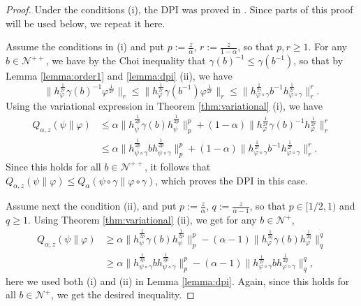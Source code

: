 \documentclass[12pt]{article}
\theoremstyle{definition}
\theoremstyle{remark}
\numberwithin{equation}{section}
\def\Ne{\mathcal N}
\begin{document}
\begin{proof} Under the conditions (i), the DPI was proved in \cite[Theorem 1
(viii)]{kato2023onrenyi}.
 Since parts of this proof will be used below, we repeat it here.

 Assume the conditions in (i) and put $p:=\frac{z}{\alpha}$, $r:=\frac{z}{1-\alpha}$, so
 that  $p,r\ge 1$. 
For any   $b\in \Ne^{++}$, we have by  the Choi inequality \cite{choi1974aschwarz} 
that  $\gamma(b)^{-1}\le \gamma(b^{-1})$, so that  by Lemma \ref{lemma:order1} and
\ref{lemma:dpi} (ii), we have 
\begin{equation}\label{eq:ineq}
\|h_\varphi^{\frac{1}{2r}}\gamma(b)^{-1}\varphi^{\frac{1}{2r}}\|_r\le
\|h_\varphi^{\frac{1}{2r}}\gamma(b^{-1})\varphi^{\frac{1}{2r}}\|_r\le\|h_{\varphi\circ\gamma}^{\frac{1}{2r}}b^{-1}h_{\varphi\circ\gamma}^{\frac{1}{2r}}\|_r^r .
\end{equation}
Using the variational expression in Theorem \ref{thm:variational} (i), we have
\begin{align}\label{eq:dpif}
Q_{\alpha,z}(\psi\|\varphi)&\le \alpha\|h_\psi^{\frac{1}{2p}}\gamma(b)h_\psi^{\frac{1}{2p}}\|_p^p+
(1-\alpha)\|h_\varphi^{\frac{1}{2r}}\gamma(b)^{-1}h_\varphi^{\frac{1}{2r}}\|_r^r\\
&\le  \alpha\|h_{\psi\circ\gamma}^{\frac{1}{2p}}bh_{\psi\circ\gamma}^{\frac{1}{2p}}\|_p^p+
(1-\alpha)\|h_{\varphi\circ\gamma}^{\frac{1}{2r}}b^{-1}h_{\varphi\circ\gamma}^{\frac{1}{2r}}\|_r^r.\label{eq:dpil}
\end{align}
 Since this holds for all
$b\in \Ne^{++}$, it follows that $Q_{\alpha,z}(\psi\|\varphi)\le
Q_{\alpha}(\psi\circ\gamma\|\varphi\circ\gamma)$, which proves the DPI in this case.


Assume next the condition (ii), and put $p:=\frac{z}{\alpha}$, $q:=\frac{z}{\alpha-1}$, so
that $p\in [1/2,1)$ and $q\ge 1$. Using Theorem
\ref{thm:variational} (ii), we get for any $b\in \Ne^+$,
\begin{align*}
Q_{\alpha,z}(\psi\|\varphi)&\ge
\alpha\|h_\psi^{\frac{1}{2p}}\gamma(b)h_\psi^{\frac{1}{2p}}\|_p^p-
(\alpha-1)\|h_\varphi^{\frac{1}{2q}}\gamma(b)h_\varphi^{\frac{1}{2q}}\|_q^q\\
&\ge \alpha\|h_{\psi\circ\gamma}^{\frac{1}{2p}}bh_{\psi\circ\gamma}^{\frac{1}{2p}}\|_p^p-
(\alpha-1)\|h_{\varphi\circ\gamma}^{\frac{1}{2r}}bh_{\varphi\circ\gamma}^{\frac{1}{2q}}\|_q^q,
\end{align*}
here we used both (i) and (ii) in Lemma \ref{lemma:dpi}. Again, since this holds for all
$b\in \Ne^+$, we get the desired inequality.



\end{proof}
\end{document}
